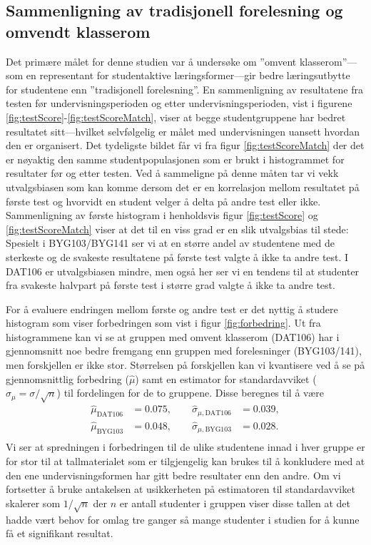 \documentclass[a4paper,norsk,12pt]{article}
\begin{document}
\subsection{Sammenligning av tradisjonell forelesning og omvendt klasserom}
Det primære målet for denne studien var å undersøke om ''omvent klasserom''---som en representant for studentaktive læringsformer---gir bedre læringsutbytte for studentene enn ''tradisjonell forelesning''. En sammenligning av resultatene fra testen før undervisningsperioden og etter undervisningsperioden, vist i figurene \ref{fig:testScore}-\ref{fig:testScoreMatch}, viser at begge studentgruppene har bedret resultatet sitt---hvilket selvfølgelig er målet med undervisningen uansett hvordan den er organisert. Det tydeligste bildet får vi fra figur \ref{fig:testScoreMatch} der det er nøyaktig den samme studentpopulasjonen som er brukt i histogrammet for resultater før og etter testen. Ved å sammeligne på denne måten tar vi vekk utvalgsbiasen som kan komme dersom det er en korrelasjon mellom resultatet på første test og hvorvidt en student velger å delta på andre test eller ikke. Sammenligning av første histogram i henholdsvis figur \ref{fig:testScore} og \ref{fig:testScoreMatch} viser at det til en viss grad er en slik utvalgsbias til stede: Spesielt i BYG103/BYG141 ser vi at en større andel av studentene med de sterkeste og de svakeste resultatene på første test valgte å ikke ta andre test. I DAT106 er utvalgsbiasen mindre, men også her ser vi en tendens til at studenter fra svakeste halvpart på første test i større grad valgte å ikke ta andre test. 

For å evaluere endringen mellom første og andre test er det nyttig å studere histogram som viser forbedringen som vist i figur \ref{fig:forbedring}. Ut fra histogrammene kan vi se at gruppen med omvent klasserom (DAT106) har i gjennomsnitt noe bedre fremgang enn gruppen med forelesninger (BYG103/141), men forskjellen er ikke stor. Størrelsen på forskjellen kan vi kvantisere ved å se på gjennomsnittlig forbedring ($\hat{\mu}$) samt en estimator for standardavviket ($\hat{\sigma}_\mu = \sigma/\sqrt{n}$) til fordelingen for de to gruppene. Disse beregnes til å være
\begin{displaymath}
\begin{aligned}
	\hat{\mu}_\text{DAT106} &= 0.075,\quad\quad \hat{\sigma}_{\mu,\text{DAT106}} &= 0.039, \\
	\hat{\mu}_\text{BYG103} &= 0.048,\quad\quad \hat{\sigma}_{\mu,\text{BYG103}} &= 0.028. \\
\end{aligned}
\end{displaymath}
Vi ser at spredningen i forbedringen til de ulike studentene innad i hver gruppe er for stor til at tallmaterialet som er tilgjengelig kan brukes til å konkludere med at den ene undervisningsformen har gitt bedre resultater enn den andre. Om vi fortsetter å bruke antakelsen at usikkerheten på estimatoren til standardavviket skalerer som $1/\sqrt{n}$ der $n$ er antall studenter i gruppen viser disse tallen at det hadde vært behov for omlag tre ganger så mange studenter i studien for å kunne få et signifikant resultat.
\end{document}
